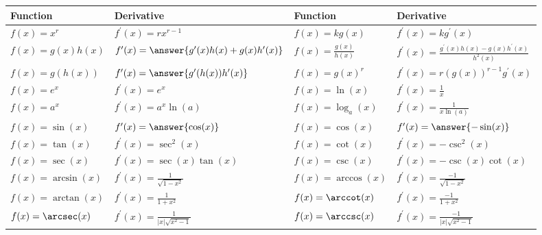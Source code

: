 \documentclass{ximera}
\begin{document}
\begin{center}
\begin{tabular}[t]{|l|l|l|l|}
\hline
Function & Derivative & Function & Derivative \\
\hline
$f(x)=x^{r}$ & $f^{\prime}(x)=r x^{r-1}$ & $f(x)=k g(x)$ & $f^{\prime}(x)=k g^{\prime}(x)$ \\
\hline
$f(x)=g(x) h(x)$ & $f^{\prime}(x)=\answer{g^{\prime}(x) h(x)+g(x) h^{\prime}(x)}$ & $f(x)=\frac{g(x)}{h(x)}$ & $f^{\prime}(x)=\frac{g^{\prime}(x) h(x)-g(x) h^{\prime}(x)}{h^{2}(x)}$ \\
\hline
$f(x)=g(h(x))$ & $f^{\prime}(x)=\answer{g^{\prime}(h(x)) h^{\prime}(x)}$ & $f(x)=g(x)^{r}$ & $f^{\prime}(x)=r(g(x))^{r-1} g^{\prime}(x)$ \\
\hline
$f(x)=e^{x}$ & $f^{\prime}(x)=e^{x}$ & $f(x)=\ln (x)$ & $f^{\prime}(x)=\frac{1}{x}$ \\
\hline
$f(x)=a^{x}$ & $f^{\prime}(x)=a^{x} \ln (a)$ & $f(x)=\log _{a}(x)$ & $f^{\prime}(x)=\frac{1}{x \ln (a)}$ \\
\hline
$f(x)=\sin (x)$ & $f^{\prime}(x)=\answer{\cos(x)}$ & $f(x)=\cos (x)$ & $f^{\prime}(x)=\answer{-\sin(x)}$ \\
\hline
$f(x)=\tan (x)$ & $f^{\prime}(x)=\sec ^{2}(x)$ & $f(x)=\cot (x)$ & $f^{\prime}(x)=-\csc ^{2}(x)$ \\
\hline
$f(x)=\sec (x)$ & $f^{\prime}(x)=\sec (x) \tan (x)$ & $f(x)=\csc (x)$ & $f^{\prime}(x)=-\csc (x) \cot (x)$ \\
\hline
$f(x)=\arcsin (x)$ & $f^{\prime}(x)=\frac{1}{\sqrt{1-x^{2}}}$ & $f(x)=\arccos (x)$ & $f^{\prime}(x)=\frac{-1}{\sqrt{1-x^{2}}}$ \\
\hline
$f(x)=\arctan (x)$ & $f^{\prime}(x)=\frac{1}{1+x^{2}}$ & $f(x)=\arccot(x)$ & $f^{\prime}(x)=\frac{-1}{1+x^{2}}$ \\
\hline
$f(x)=\arcsec(x)$ & $f^{\prime}(x)=\frac{1}{|x| \sqrt{x^{2}-1}}$ & $f(x)=\arccsc(x)$ & $f^{\prime}(x)=\frac{-1}{|x| \sqrt{x^{2}-1}}$ \\
\hline
\end{tabular}
\end{center}
\end{document}

